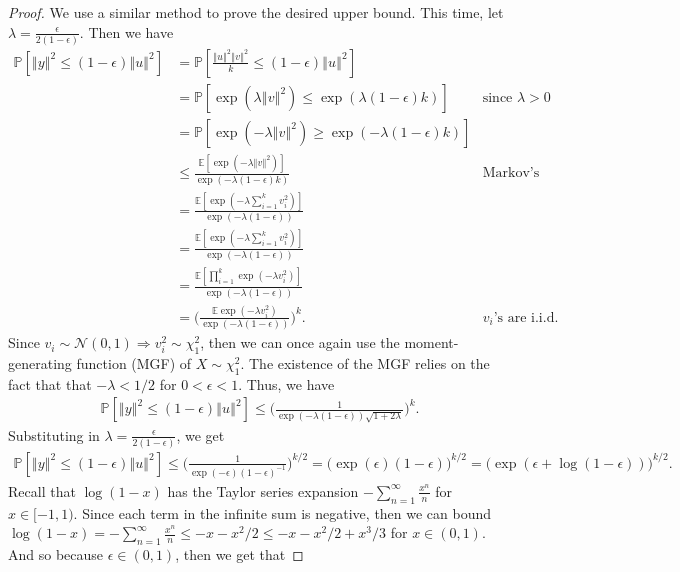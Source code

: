 \documentclass{article}
\begin{document}
\begin{proof}
We use a similar method to prove the desired upper bound. This time, let $\lambda = \frac{\epsilon}{2(1-\epsilon)}.$  Then we have 
\begin{align*}
\mathbb{P} \left[ \left\Vert y \right\Vert^2 \leq (1-\epsilon) \left\Vert u \right\Vert^2 \right] & = \mathbb{P} \left[ \frac{\left\Vert u \right\Vert^2 \left\Vert v \right\Vert^2}{k} \leq (1-\epsilon) \left\Vert u \right\Vert^2 \right]\\
& = \mathbb{P} \left[\exp(\lambda \left\Vert v \right\Vert^2) \leq \exp(\lambda (1-\epsilon) k) \right] & \text{since $\lambda > 0$}\\
& = \mathbb{P} \left[ \exp( - \lambda \left\Vert v \right\Vert^2) \geq \exp( - \lambda (1-\epsilon) k) \right] \\
& \leq \frac{\mathbb{E}[\exp( - \lambda \left\Vert v \right\Vert^2)]}{\exp( - \lambda (1-\epsilon) k)}  & \text{Markov's inequality}\\
 & = \frac{\mathbb{E}[\exp( - \lambda \sum_{i=1}^k v_i^2)]}{\exp( - \lambda (1-\epsilon) )}\\
 &= \frac{\mathbb{E}[\exp( - \lambda \sum_{i=1}^k v_i^2)]}{\exp( - \lambda (1-\epsilon) )}\\
 &= \frac{\mathbb{E} \left[\prod_{i=1}^k \exp( - \lambda v_i^2) \right]}{\exp( - \lambda (1-\epsilon) )}\\
 &= \bigg( \frac{\mathbb{E}\exp(-\lambda v_i^2)}{\exp( - \lambda (1-\epsilon) )} \bigg)^k. & \text{$v_i$'s are i.i.d.}
\end{align*}
Since $v_i \sim \mathcal{N}(0, 1) \Rightarrow v_i^2 \sim \chi_1^2$, then we can once again use the moment-generating function (MGF) of $X \sim \chi_1^2$. The existence of the MGF relies on the fact that that $-\lambda < 1/2$ for $0 < \epsilon < 1$. Thus, we have
\begin{align*}
    \mathbb{P}\left[ \left\Vert y \right\Vert^2 \leq (1-\epsilon) \left\Vert u \right\Vert^2 \right] \leq \bigg(\frac{1}{ \exp(-\lambda (1-\epsilon)) \sqrt{1+2\lambda} } \bigg)^k.
\end{align*}
Substituting in $\lambda = \frac{\epsilon}{2(1-\epsilon)}$, we get
\begin{align*}
     \mathbb{P}\left[ \left\Vert y \right\Vert^2 \leq (1-\epsilon) \left\Vert u \right\Vert^2 \right] \leq \bigg( \frac{1}{\exp(-\epsilon)(1 - \epsilon)^{-1}} \bigg)^{k/2} = \bigg( \exp(\epsilon)(1 - \epsilon) \bigg)^{k/2} = \bigg( \exp(\epsilon + \log(1 - \epsilon)) \bigg)^{k/2}.
\end{align*}
Recall that $\log(1 - x)$ has the Taylor series expansion $- \sum_{n=1}^{\infty} \frac{x^n}{n}$ for $x \in [-1, 1)$. Since each term in the infinite sum is negative, then we can bound $\log(1 - x) = - \sum_{n=1}^{\infty} \frac{x^n}{n} \leq - x -x^2/2 \leq - x -x^2/2 + x^3/3$ for $x \in (0, 1)$. And so because $\epsilon \in (0,1)$, then we get that 

\end{proof}
\end{document}
